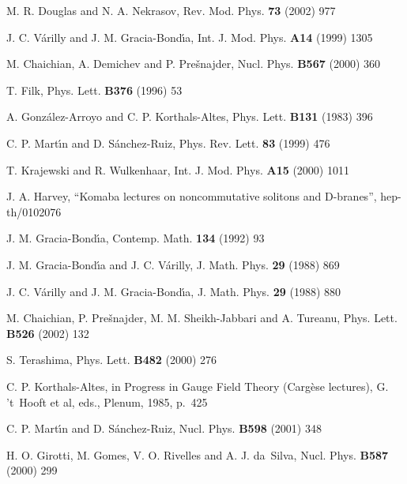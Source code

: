 \documentclass[a4paper,12pt]{article}
\providecommand{\1}{\mathbf{1}}         %
\providecommand{\7}{\dagger}            %
\providecommand{\8}{\bullet}            %
\renewcommand{\.}{\cdot}            %
\renewcommand{\:}{\colon}           %
\begin{document}
\begin{thebibliography}{92}
M. R. Douglas and N. A. Nekrasov,
Rev. Mod. Phys. {\bf 73} (2002) 977

J. C. V\'arilly and J. M. Gracia-Bond\'{\i}a,
Int. J. Mod. Phys. {\bf A14} (1999) 1305

M. Chaichian, A. Demichev and P. Pre\v{s}najder,
Nucl. Phys. {\bf B567} (2000) 360

T. Filk,
Phys. Lett. {\bf B376} (1996) 53

A. Gonz\'alez-Arroyo and C. P. Korthals-Altes,
Phys. Lett. {\bf B131} (1983) 396

C. P. Mart\'{\i}n and D. S\'anchez-Ruiz,
Phys. Rev. Lett. {\bf 83} (1999) 476

T. Krajewski and R. Wulkenhaar,
Int. J. Mod. Phys. {\bf A15} (2000) 1011

J. A. Harvey,
``Komaba lectures on noncommutative solitons and D-branes'',
hep-th/0102076

J. M. Gracia-Bond\'{\i}a,
Contemp. Math. {\bf 134} (1992) 93

J. M. Gracia-Bond{\'\i}a and J. C. V\'arilly,
J. Math. Phys. {\bf 29} (1988) 869

J. C. V\'arilly and J. M. Gracia-Bond{\'\i}a,
J. Math. Phys. {\bf 29} (1988) 880

M. Chaichian, P. Pre\v{s}najder, M. M. Sheikh-Jabbari and A. Tureanu,
Phys. Lett. {\bf B526} (2002) 132

S. Terashima,
Phys. Lett. {\bf B482} (2000) 276

C. P. Korthals-Altes,
in Progress in Gauge Field Theory (Carg\`ese lectures),
G. 't~Hooft et al, eds., Plenum, 1985, p.~425

C. P. Mart\'{\i}n and D. S\'anchez-Ruiz,
Nucl. Phys. {\bf B598} (2001) 348

H. O. Girotti, M. Gomes, V. O. Rivelles and A. J. da~Silva,
Nucl. Phys. {\bf B587} (2000) 299


\end{thebibliography}
\end{document}
